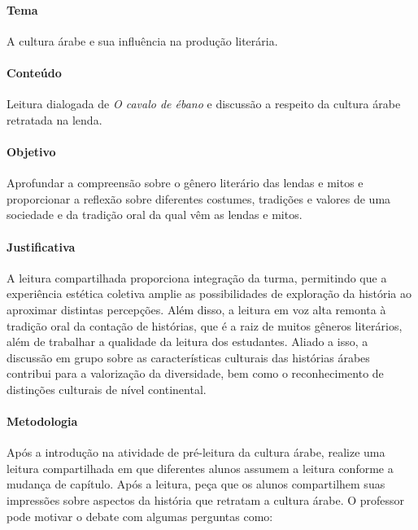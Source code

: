 \documentclass[11pt]{extarticle}
\begin{document}
\paragraph{Tema} A cultura árabe e sua influência na produção literária.

\paragraph{Conteúdo} Leitura dialogada de \textit{O cavalo de ébano} e discussão a respeito da cultura árabe retratada na lenda.

\paragraph{Objetivo} Aprofundar a compreensão sobre o gênero literário das lendas e mitos e proporcionar a reflexão sobre diferentes costumes, tradições e valores de uma sociedade e da tradição oral da qual vêm as lendas e mitos.

\paragraph{Justificativa} A leitura compartilhada proporciona integração da turma, permitindo que a experiência estética coletiva amplie as possibilidades de exploração da história ao aproximar distintas percepções. Além disso, a leitura em voz alta remonta à tradição oral da contação de histórias, que é a raiz de muitos gêneros literários, além de trabalhar a qualidade da leitura dos estudantes. Aliado a isso, a discussão em grupo sobre as características culturais das histórias árabes contribui para a valorização da diversidade, bem como o reconhecimento de distinções culturais de nível continental.

\paragraph{Metodologia} Após a introdução na atividade de pré-leitura da cultura árabe, realize uma leitura compartilhada em que diferentes alunos assumem a leitura conforme a mudança de capítulo. Após a leitura, peça que os alunos compartilhem suas impressões sobre aspectos da história que retratam a cultura árabe.
O professor pode motivar o debate com algumas perguntas como:
\end{document}
